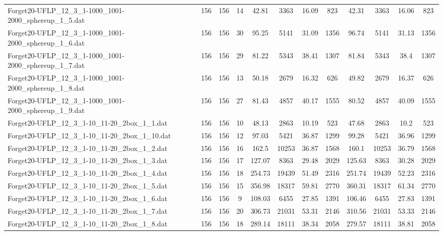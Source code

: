 \begin{sidewaystable}[!ht]
{\begin{tabular}{lccccccccccc}
Forget20-UFLP\_12\_3\_1-1000\_1001-2000\_sphereup\_1\_5.dat & 156 & 156 & 14 & 42.81 & 3363 & 16.09 & 823 & 42.31 & 3363 &  \textcolor{blue2}{16.06} & 823 \\
Forget20-UFLP\_12\_3\_1-1000\_1001-2000\_sphereup\_1\_6.dat & 156 & 156 & 30 & 95.25 & 5141 &  \textcolor{blue2}{31.09} & 1356 & 96.74 & 5141 & 31.13 & 1356 \\
Forget20-UFLP\_12\_3\_1-1000\_1001-2000\_sphereup\_1\_7.dat & 156 & 156 & 29 & 81.22 & 5343 & 38.41 & 1307 & 81.84 & 5343 & 38.4 & 1307 \\
Forget20-UFLP\_12\_3\_1-1000\_1001-2000\_sphereup\_1\_8.dat & 156 & 156 & 13 & 50.18 & 2679 & 16.32 & 626 & 49.82 & 2679 & 16.37 & 626 \\
Forget20-UFLP\_12\_3\_1-1000\_1001-2000\_sphereup\_1\_9.dat & 156 & 156 & 27 & 81.43 & 4857 & 40.17 & 1555 & 80.52 & 4857 &  \textcolor{blue2}{40.09} & 1555 \\
Forget20-UFLP\_12\_3\_1-10\_11-20\_2box\_1\_1.dat & 156 & 156 & 10 & 48.13 & 2863 &  \textcolor{blue2}{10.19} & 523 & 47.68 & 2863 & 10.2 & 523 \\
Forget20-UFLP\_12\_3\_1-10\_11-20\_2box\_1\_10.dat & 156 & 156 & 12 & 97.03 & 5421 &  \textcolor{blue2}{36.87} & 1299 & 99.28 & 5421 & 36.96 & 1299 \\
Forget20-UFLP\_12\_3\_1-10\_11-20\_2box\_1\_2.dat & 156 & 156 & 16 & 162.5 & 10253 & 36.87 & 1568 & 160.1 & 10253 &  \textcolor{blue2}{36.79} & 1568 \\
Forget20-UFLP\_12\_3\_1-10\_11-20\_2box\_1\_3.dat & 156 & 156 & 17 & 127.07 & 8363 & 29.48 & 2029 & 125.63 & 8363 & 30.28 & 2029 \\
Forget20-UFLP\_12\_3\_1-10\_11-20\_2box\_1\_4.dat & 156 & 156 & 18 & 254.73 & 19439 & 51.49 & 2316 & 251.74 & 19439 & 52.23 & 2316 \\
Forget20-UFLP\_12\_3\_1-10\_11-20\_2box\_1\_5.dat & 156 & 156 & 15 & 356.98 & 18317 & 59.81 & 2770 & 360.31 & 18317 & 61.34 & 2770 \\
Forget20-UFLP\_12\_3\_1-10\_11-20\_2box\_1\_6.dat & 156 & 156 & 9 & 108.03 & 6455 & 27.85 & 1391 & 106.46 & 6455 &  \textcolor{blue2}{27.83} & 1391 \\
Forget20-UFLP\_12\_3\_1-10\_11-20\_2box\_1\_7.dat & 156 & 156 & 20 & 306.73 & 21031 &  \textcolor{blue2}{53.31} & 2146 & 310.56 & 21031 & 53.33 & 2146 \\
Forget20-UFLP\_12\_3\_1-10\_11-20\_2box\_1\_8.dat & 156 & 156 & 18 & 289.14 & 18111 &  \textcolor{blue2}{38.34} & 2058 & 279.57 & 18111 & 38.81 & 2058 \\

\end{tabular}}
\end{sidewaystable}
